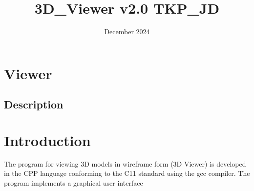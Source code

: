 \documentclass{article}
\title{3D\_Viewer v2.0 TKP\_JD}
\author{} %
\date{December 2024} %
\begin{document}
\maketitle


\section{Viewer}
\subsection{Description}
\section{Introduction}

The program for viewing 3D models in wireframe form (3D Viewer) is developed in the CPP language conforming to the C11 standard using the gcc compiler. The program implements a graphical user interface
\end{document}

